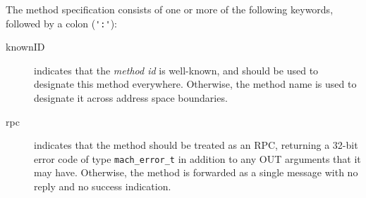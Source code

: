 The method specification consists of one or more of the following
keywords, followed by a colon (\verb|':'|):
\begin{description}
\item[knownID] indicates that the {\em method id} is well-known, and
should be used to designate this method everywhere. Otherwise, the
method name is used to designate it across address space boundaries.

\item[rpc] indicates that the method should be treated as an RPC,
returning a 32-bit error code of type \verb|mach_error_t| in addition
to any OUT arguments that it may have. Otherwise, the method is
forwarded as a single message with no reply and no success indication.
\end{description}

